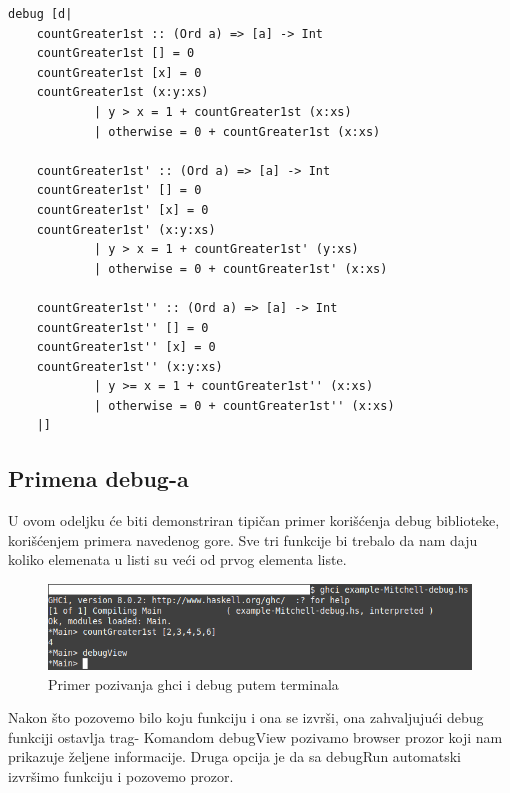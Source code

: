 \documentclass[a4paper]{article}
\begin{document}
{\begin{lstlisting}[caption={Okružujemo naš kod funkcijom debug, iz biblioteke Debug, sa uključivanjem ekstenzija navedenih u prvom redu}, language=Haskell]
debug [d|
    countGreater1st :: (Ord a) => [a] -> Int
    countGreater1st [] = 0
    countGreater1st [x] = 0
    countGreater1st (x:y:xs) 
            | y > x = 1 + countGreater1st (x:xs)
            | otherwise = 0 + countGreater1st (x:xs)
    
    countGreater1st' :: (Ord a) => [a] -> Int
    countGreater1st' [] = 0
    countGreater1st' [x] = 0
    countGreater1st' (x:y:xs) 
            | y > x = 1 + countGreater1st' (y:xs)
            | otherwise = 0 + countGreater1st' (x:xs)

    countGreater1st'' :: (Ord a) => [a] -> Int
    countGreater1st'' [] = 0
    countGreater1st'' [x] = 0
    countGreater1st'' (x:y:xs) 
            | y >= x = 1 + countGreater1st'' (x:xs)
            | otherwise = 0 + countGreater1st'' (x:xs)
    |]
\end{lstlisting}

\subsection{Primena debug-a}
U ovom odeljku će biti demonstriran tipičan primer korišćenja debug biblioteke, korišćenjem primera navedenog gore. Sve tri funkcije bi trebalo da nam daju koliko elemenata u listi su veći od prvog elementa liste.

\begin{figure}[h!]
\begin{center}
\includegraphics[scale=0.5]{pozivanje-mitchell.png}
\caption{Primer pozivanja ghci i debug putem terminala}
\end{center}
\end{figure}

Nakon što pozovemo bilo koju funkciju i ona se izvrši, ona zahvaljujući debug funkciji ostavlja trag- Komandom debugView pozivamo browser prozor koji nam prikazuje željene informacije. Druga opcija je da sa debugRun automatski izvršimo funkciju i pozovemo prozor.

}
\end{document}
